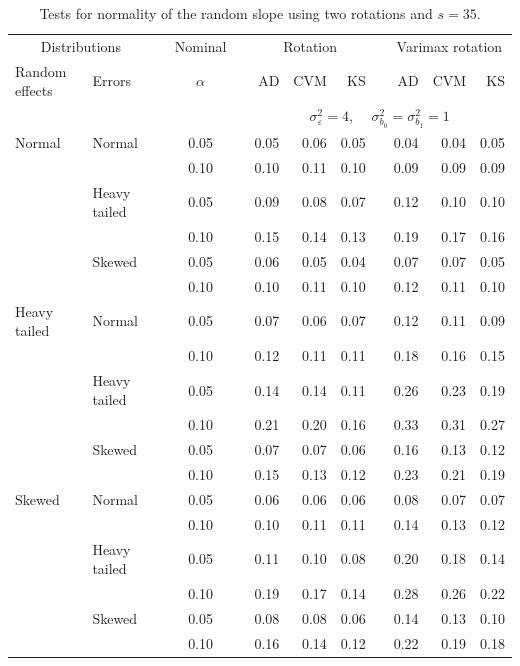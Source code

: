 \documentclass[12pt]{article} %
\begin{document}
\begin{table}[ht]
\caption{Tests for normality of the random slope using two rotations and $s = 35$.}
\begin{scriptsize}
\begin{center}
\begin{tabular}{ll p{.1cm} c p{.1cm} rrr p{.1cm} rrr}
  \hline
  \multicolumn{2}{c}{Distributions}& & Nominal & &  \multicolumn{3}{c}{Rotation} & & \multicolumn{3}{c}{Varimax rotation} \\ \cline{1-2} \cline{6-8} \cline{10-12}   
  Random effects & Errors & & $\alpha$ & & AD & CVM & KS & & AD & CVM & KS \\ 
   \hline
& && && \multicolumn{7}{c}{$\sigma_{\varepsilon}^2 = 4$, \ \ $\sigma_{b_0}^2 = \sigma_{b_1}^2 = 1$} \\ \cline{6-12}
Normal       & Normal       && 0.05 &&  0.05 & 0.06 & 0.05 && 0.04 & 0.04 & 0.05 \\ 
             &              && 0.10 &&  0.10 & 0.11 & 0.10 && 0.09 & 0.09 & 0.09 \\ 
             & Heavy tailed && 0.05 &&  0.09 & 0.08 & 0.07 && 0.12 & 0.10 & 0.10 \\ 
             &              && 0.10 &&  0.15 & 0.14 & 0.13 && 0.19 & 0.17 & 0.16 \\ 
             & Skewed       && 0.05 &&  0.06 & 0.05 & 0.04 && 0.07 & 0.07 & 0.05 \\ 
             &              && 0.10 &&  0.10 & 0.11 & 0.10 && 0.12 & 0.11 & 0.10 \\ 
Heavy tailed & Normal       && 0.05 &&  0.07 & 0.06 & 0.07 && 0.12 & 0.11 & 0.09 \\ 
             &              && 0.10 &&  0.12 & 0.11 & 0.11 && 0.18 & 0.16 & 0.15 \\ 
             & Heavy tailed && 0.05 &&  0.14 & 0.14 & 0.11 && 0.26 & 0.23 & 0.19 \\ 
             &              && 0.10 &&  0.21 & 0.20 & 0.16 && 0.33 & 0.31 & 0.27 \\ 
             & Skewed       && 0.05 &&  0.07 & 0.07 & 0.06 && 0.16 & 0.13 & 0.12 \\ 
             &              && 0.10 &&  0.15 & 0.13 & 0.12 && 0.23 & 0.21 & 0.19 \\ 
Skewed       & Normal       && 0.05 &&  0.06 & 0.06 & 0.06 && 0.08 & 0.07 & 0.07 \\ 
             &              && 0.10 &&  0.10 & 0.11 & 0.11 && 0.14 & 0.13 & 0.12 \\ 
             & Heavy tailed && 0.05 &&  0.11 & 0.10 & 0.08 && 0.20 & 0.18 & 0.14 \\ 
             &              && 0.10 &&  0.19 & 0.17 & 0.14 && 0.28 & 0.26 & 0.22 \\ 
             & Skewed       && 0.05 &&  0.08 & 0.08 & 0.06 && 0.14 & 0.13 & 0.10 \\ 
             &              && 0.10 &&  0.16 & 0.14 & 0.12 && 0.22 & 0.19 & 0.18 \\ 


\end{tabular}
\end{center}
\end{scriptsize}
\end{table}
\end{document}
